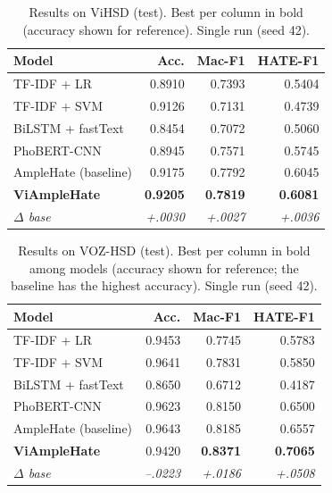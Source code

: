 \documentclass[11pt]{article}
\begin{document}
\begin{table}[t]
  \centering
  \small
  \begin{tabular}{lrrr}
    \toprule
    \textbf{Model} & \textbf{Acc.} & \textbf{Mac-F1} & \textbf{HATE-F1} \\
    \midrule
    TF-IDF + LR          & 0.8910 & 0.7393 & 0.5404 \\
    TF-IDF + SVM         & 0.9126 & 0.7131 & 0.4739 \\
    BiLSTM + fastText    & 0.8454 & 0.7072 & 0.5060 \\
    PhoBERT-CNN          & 0.8945 & 0.7571 & 0.5745 \\
    AmpleHate (baseline) & 0.9175 & 0.7792 & 0.6045 \\
    \textbf{ViAmpleHate} & \textbf{0.9205} & \textbf{0.7819} & \textbf{0.6081} \\
    \textit{$\Delta$ base} & \textit{+.0030} & \textit{+.0027} & \textit{+.0036} \\
    \bottomrule
  \end{tabular}
  \caption{Results on ViHSD (test). Best per column in bold (accuracy shown for reference). Single run (seed 42).}
  \label{tab:vihsd}
\end{table}

\begin{table}[t]
  \centering
  \small
  \begin{tabular}{lrrr}
    \toprule
    \textbf{Model} & \textbf{Acc.} & \textbf{Mac-F1} & \textbf{HATE-F1} \\
    \midrule
    TF-IDF + LR          & 0.9453 & 0.7745 & 0.5783 \\
    TF-IDF + SVM         & 0.9641 & 0.7831 & 0.5850 \\
    BiLSTM + fastText    & 0.8650 & 0.6712 & 0.4187 \\
    PhoBERT-CNN          & 0.9623 & 0.8150 & 0.6500 \\
    AmpleHate (baseline) & 0.9643 & 0.8185 & 0.6557 \\
    \textbf{ViAmpleHate} & 0.9420 & \textbf{0.8371} & \textbf{0.7065} \\
    \textit{$\Delta$ base} & \textit{--.0223} & \textit{+.0186} & \textit{+.0508} \\
    \bottomrule
  \end{tabular}
  \caption{Results on VOZ-HSD (test). Best per column in bold among models (accuracy shown for reference; the baseline has the highest accuracy). Single run (seed 42).}
  \label{tab:voz}
\end{table}
\end{document}
